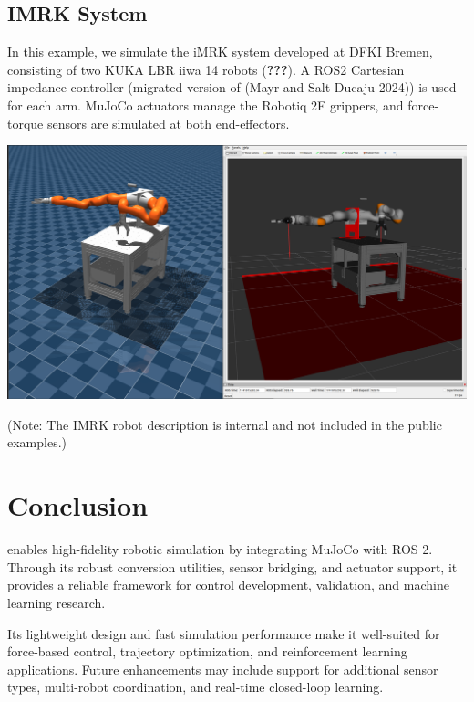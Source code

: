 \documentclass[10pt,a4paper,onecolumn]{article}
\let\origfigure\figure
\let\endorigfigure\endfigure
\renewenvironment{figure}[1][2] {
    \expandafter\origfigure\expandafter[H]
} {
    \endorigfigure
}
\let\textttOrig=\texttt
\def\texttt#1{\expandafter\textttOrig{\seqsplit{#1}}}
\begin{document}
\hypertarget{imrk-system}{%
\subsection{IMRK System}\label{imrk-system}}

In this example, we simulate the iMRK system developed at DFKI Bremen,
consisting of two KUKA LBR iiwa 14 robots ({\textbf{???}}). A ROS2
Cartesian impedance controller (migrated version of (Mayr and
Salt-Ducaju 2024)) is used for each arm. MuJoCo actuators manage the
Robotiq 2F grippers, and force-torque sensors are simulated at both
end-effectors.

\begin{figure}
\centering
\includegraphics{./figures/kuka_imrk_example.png}
\caption{IMRK with Robotiq 2F Gripper and Robotiq FT300 Sensor}
\end{figure}

(Note: The IMRK robot description is internal and not included in the
public examples.)

\hypertarget{conclusion}{%
\section{Conclusion}\label{conclusion}}

\texttt{MujocoROS2Control} enables high-fidelity robotic simulation by
integrating MuJoCo with ROS 2. Through its robust conversion utilities,
sensor bridging, and actuator support, it provides a reliable framework
for control development, validation, and machine learning research.

Its lightweight design and fast simulation performance make it
well-suited for force-based control, trajectory optimization, and
reinforcement learning applications. Future enhancements may include
support for additional sensor types, multi-robot coordination, and
real-time closed-loop learning.
\end{document}
